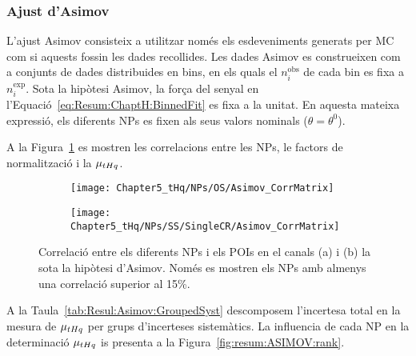 \subsubsection{Ajust d'Asimov}
\label{sec:resum:Resultats:Asimov}
L'ajust Asimov consisteix a utilitzar només els esdeveniments generats per MC com si aquests fossin 
les dades recollides. Les dades Asimov es construeixen com a conjunts de dades distribuides en bins, 
en els quals el $n_{i}^{\text{obs}}$ de cada bin es fixa a $n_{i}^{\text{exp}}$. 
Sota la hipòtesi Asimov, la força del senyal en l'Equació~\ref{eq:Resum:ChaptH:BinnedFit} es fixa a la unitat. 
En aquesta mateixa expressió, els diferents NPs es fixen als seus valors nominals ($\theta = \theta^{0}$).


A la Figura~\ref{fig:resum:ASIMOV:correlations} es mostren les correlacions entre les
NPs, le factors de normalització i la $\mu_{tHq}$.


\begin{figure}[h]
\centering
\begin{subfigure}{.5\textwidth}
  \centering
  \texttt{[image: Chapter5\_tHq/NPs/OS/Asimov\_CorrMatrix]}
  \caption{}
\end{subfigure}%
\hfill
\begin{subfigure}{.5\textwidth}
  \centering
  \texttt{[image: Chapter5\_tHq/NPs/SS/SingleCR/Asimov\_CorrMatrix]}
  \caption{}
\end{subfigure}%
\caption{
Correlació entre els diferents NPs i els POIs en el canals (a) \dilepOStau i (b)  \dilepSStau la sota la hipòtesi d'Asimov. 
Només es mostren els NPs amb almenys una correlació superior al 15\%.} 
\label{fig:resum:ASIMOV:correlations}
\end{figure}



A la Taula~\ref{tab:Resul:Asimov:GroupedSyst} descomposem l'incertesa 
total en la mesura de $\mu_{tHq}$ per grups d'incerteses sistemàtics.
La influencia de cada NP en la determinació $\mu_{tHq}$ is presenta
a la Figura~\ref{fig:resum:ASIMOV:rank}.



